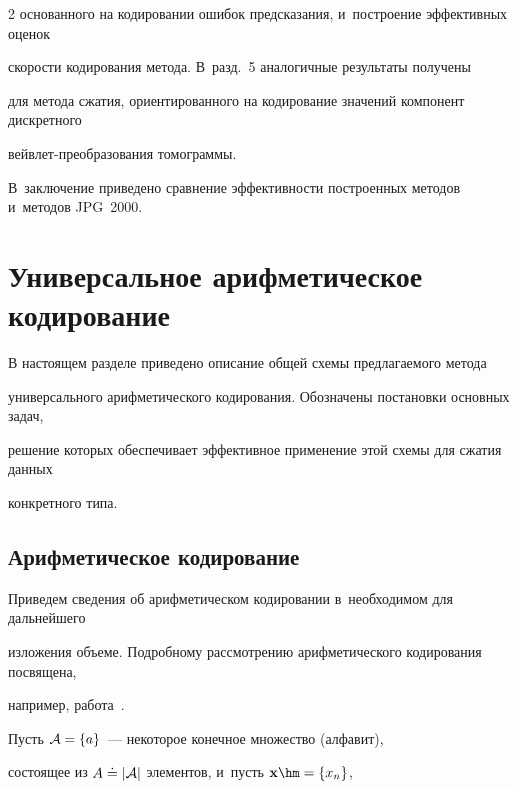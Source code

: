 \begin{multicols}{2}
основанного на кодировании ошибок предсказания, и~построение эффективных оценок 

ско\-рости кодирования метода. В~разд.~5 аналогичные результаты получены 

для метода сжатия, ориентированного на кодирование значений компонент дискретного 

вей\-в\-лет-пре\-об\-ра\-зо\-ва\-ния томограммы. 

В~заключение приведено сравнение эф\-фек\-тив\-ности построенных методов и~методов JPG~2000.



\vspace*{-9pt}



\section{Универсальное арифметическое кодирование}




В настоящем разделе приведено описание общей схемы предлагаемого метода 

универсального арифметического кодирования. Обозначены постановки основных задач, 

решение которых обеспечивает эффективное применение этой схемы для сжатия данных 

конкретного типа.



\vspace*{-9pt}



\subsection{Арифметическое кодирование}




Приведем сведения об арифметическом кодировании в~необходимом для дальнейшего 

изложения объеме. Подробному рассмотрению арифметического кодирования посвящена, 

например, работа~\cite{b02}.



Пусть ${\cal A}= \{a\}$~--- некоторое конечное множество (алфавит), 

состоящее из $A\doteq|{\cal A}|$ элементов, и~пусть  $\mathbf{x}\hm=\{x_n\}$,  


\end{multicols}

